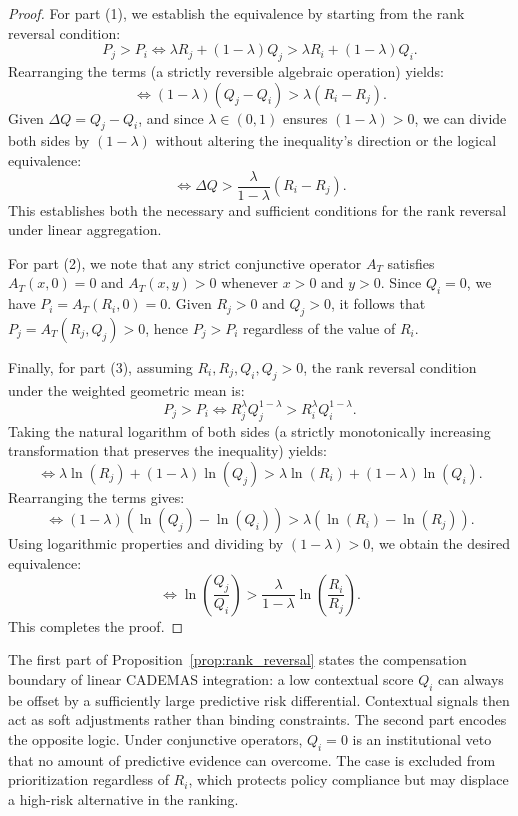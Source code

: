 \documentclass[mathematics,article,submit,moreauthors]{Definitions/mdpi}
\begin{document}
\begin{proof}
For part (1), we establish the equivalence by starting from the rank reversal condition:
$$P_j > P_i \iff \lambda R_j + (1-\lambda) Q_j > \lambda R_i + (1-\lambda) Q_i.$$
Rearranging the terms (a strictly reversible algebraic operation) yields:
$$\iff (1-\lambda)(Q_j - Q_i) > \lambda (R_i - R_j).$$
Given $\Delta Q = Q_j - Q_i$, and since $\lambda \in (0,1)$ ensures $(1-\lambda) > 0$, we can divide both sides by $(1-\lambda)$ without altering the inequality's direction or the logical equivalence:
$$\iff \Delta Q > \frac{\lambda}{1-\lambda}(R_i - R_j).$$
This establishes both the necessary and sufficient conditions for the rank reversal under linear aggregation.

For part (2), we note that any strict conjunctive operator $A_T$ satisfies $A_T(x,0)=0$ and $A_T(x,y)>0$ whenever $x>0$ and $y>0$. Since $Q_i=0$, we have $P_i = A_T(R_i,0)=0$. Given $R_j>0$ and $Q_j>0$, it follows that $P_j = A_T(R_j,Q_j) > 0$, hence $P_j > P_i$ regardless of the value of $R_i$.

Finally, for part (3), assuming $R_i, R_j, Q_i, Q_j > 0$, the rank reversal condition under the weighted geometric mean is:
$$P_j > P_i \iff R_j^\lambda Q_j^{1-\lambda} > R_i^\lambda Q_i^{1-\lambda}.$$
Taking the natural logarithm of both sides (a strictly monotonically increasing transformation that preserves the inequality) yields:
$$\iff \lambda \ln(R_j) + (1-\lambda) \ln(Q_j) > \lambda \ln(R_i) + (1-\lambda) \ln(Q_i).$$
Rearranging the terms gives:
$$\iff (1-\lambda)(\ln(Q_j) - \ln(Q_i)) > \lambda (\ln(R_i) - \ln(R_j)).$$
Using logarithmic properties and dividing by $(1-\lambda) > 0$, we obtain the desired equivalence:
\[
\iff \ln\left(\frac{Q_j}{Q_i}\right) > \frac{\lambda}{1-\lambda} \ln\left(\frac{R_i}{R_j}\right).
\]
This completes the proof.
\end{proof}

The first part of Proposition~\ref{prop:rank_reversal} states the compensation boundary of linear CADEMAS integration: a low contextual score $Q_i$ can always be offset by a sufficiently large predictive risk differential. Contextual signals then act as soft adjustments rather than binding constraints. The second part encodes the opposite logic. Under conjunctive operators, $Q_i = 0$ is an institutional veto that no amount of predictive evidence can overcome. The case is excluded from prioritization regardless of $R_i$, which protects policy compliance but may displace a high-risk alternative in the ranking.
\end{document}
